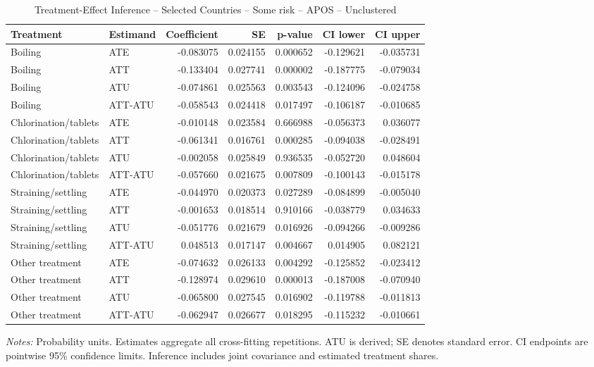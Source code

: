 \begin{table}[htbp]
\centering
\caption{Treatment-Effect Inference -- Selected Countries -- Some risk -- APOS -- Unclustered}
\label{tab:inference-SomeRiskHome-APOS-iid-selected-countries}
\scriptsize
\begin{adjustbox}{max width=\linewidth}
\begin{tabular}{llrrrrr}
\toprule
Treatment & Estimand & Coefficient & SE & p-value & CI lower & CI upper \\
\midrule
Boiling & ATE & -0.083075 & 0.024155 & 0.000652 & -0.129621 & -0.035731 \\
Boiling & ATT & -0.133404 & 0.027741 & 0.000002 & -0.187775 & -0.079034 \\
Boiling & ATU & -0.074861 & 0.025563 & 0.003543 & -0.124096 & -0.024758 \\
Boiling & ATT-ATU & -0.058543 & 0.024418 & 0.017497 & -0.106187 & -0.010685 \\
Chlorination/tablets & ATE & -0.010148 & 0.023584 & 0.666988 & -0.056373 & 0.036077 \\
Chlorination/tablets & ATT & -0.061341 & 0.016761 & 0.000285 & -0.094038 & -0.028491 \\
Chlorination/tablets & ATU & -0.002058 & 0.025849 & 0.936535 & -0.052720 & 0.048604 \\
Chlorination/tablets & ATT-ATU & -0.057660 & 0.021675 & 0.007809 & -0.100143 & -0.015178 \\
Straining/settling & ATE & -0.044970 & 0.020373 & 0.027289 & -0.084899 & -0.005040 \\
Straining/settling & ATT & -0.001653 & 0.018514 & 0.910166 & -0.038779 & 0.034633 \\
Straining/settling & ATU & -0.051776 & 0.021679 & 0.016926 & -0.094266 & -0.009286 \\
Straining/settling & ATT-ATU & 0.048513 & 0.017147 & 0.004667 & 0.014905 & 0.082121 \\
Other treatment & ATE & -0.074632 & 0.026133 & 0.004292 & -0.125852 & -0.023412 \\
Other treatment & ATT & -0.128974 & 0.029610 & 0.000013 & -0.187008 & -0.070940 \\
Other treatment & ATU & -0.065800 & 0.027545 & 0.016902 & -0.119788 & -0.011813 \\
Other treatment & ATT-ATU & -0.062947 & 0.026677 & 0.018295 & -0.115232 & -0.010661 \\
\bottomrule
\end{tabular}

\end{adjustbox}
\par\smallskip
\begin{minipage}{\linewidth}\scriptsize \textit{Notes:} Probability units. Estimates aggregate all cross-fitting repetitions. ATU is derived; SE denotes standard error. CI endpoints are pointwise 95\% confidence limits. Inference includes joint covariance and estimated treatment shares. \end{minipage}
\end{table}

